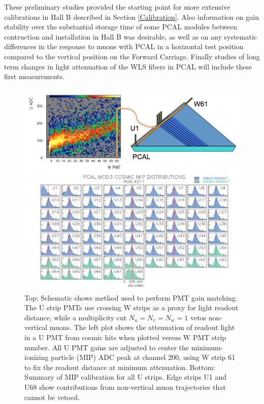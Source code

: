 These preliminary studies provided the starting point for more extensive calibrations in Hall B described in Section \ref{Calibration}.  Also information on gain stability over the substantial storage time of some PCAL modules between contruction and installation in Hall B was desirable, as well as on any systematic differences in the response to muons with PCAL in a horizontal test position compared to the vertical position on the Forward Carriage.  Finally studies of long term changes in light attenuation of the WLS fibers in PCAL will include these first measurements.

\begin{figure}[hbt]
\centering
\includegraphics[width=0.95\columnwidth,keepaspectratio]{img/S5_4.png}
\caption{Top: Schematic shows method used to perform PMT gain matching.  The U strip PMTs use crossing W strips as a proxy for light readout distance, while a multiplicity cut $N_u=N_v=N_w=1$ vetos non-vertical muons.   The left plot shows the attenuation of readout light in a U PMT from cosmic hits when plotted versus W PMT strip number.  All U PMT gains are adjusted to center the minimum-ionizing particle (MIP) ADC peak at channel 200, using W strip 61 to fix the readout distance at minimum attenuation.  Bottom: Summary of MIP calibration for all U strips.  Edge strips U1 and U68 show contributions from non-vertical muon trajectories that cannot be vetoed.}
\label{fig:S5_4}
\end{figure}

